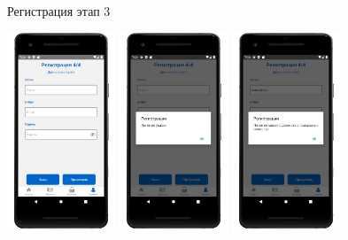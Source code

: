 \begin{figure}[!htb]

    \caption{Регистрация этап 3}
    \label{fig:test_registration_step3}
\end{figure}

\begin{figure}[!htb]\centering
    \begin{minipage}{0.19\textwidth}
        \centering

        \includegraphics[height=6cm]
        {images/mobile/registration/step4.png}
    \end{minipage}
    \begin{minipage}{0.19\textwidth}
        \centering

        \includegraphics[height=6cm]
        {images/mobile/registration/login.png}
    \end{minipage}
    \begin{minipage}{0.19\textwidth}
        \centering

        \includegraphics[height=6cm]
        {images/mobile/registration/login_special.png}
    \end{minipage}
    \begin{minipage}{0.19\textwidth}
        \centering


\end{minipage}
\end{figure}
